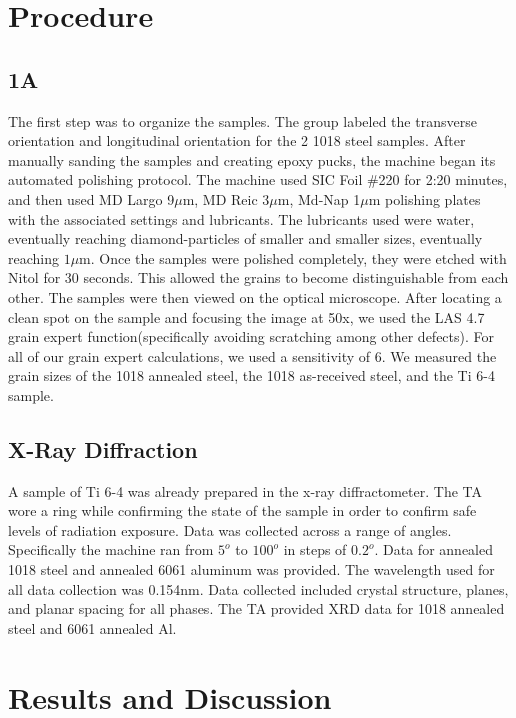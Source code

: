 \documentclass{article}
\begin{document}
\section{Procedure}

\subsection{1A}

The first step was to organize the samples. The group labeled the transverse orientation and longitudinal orientation for the 2 1018 steel samples. After manually sanding the samples and creating epoxy pucks, the machine began its automated polishing protocol. The machine used SIC Foil \#220 for 2:20 minutes, and then used MD Largo 9$\mu$m, MD Reic 3$\mu$m, Md-Nap 1$\mu$m polishing plates with the associated settings and lubricants. The lubricants used were water, eventually reaching diamond-particles of smaller and smaller sizes, eventually reaching $1\mu$m. Once the samples were polished completely, they were etched with Nitol for 30 seconds. This allowed the grains to become distinguishable from each other. The samples were then viewed on the optical microscope. After locating a clean spot on the sample and focusing the image at 50x, we used the LAS 4.7 grain expert function(specifically avoiding scratching among other defects). For all of our grain expert calculations, we used a sensitivity of 6. We measured the grain sizes of the 1018 annealed steel, the 1018 as-received steel, and the Ti 6-4 sample.

\subsection{X-Ray Diffraction}

A sample of Ti 6-4 was already prepared in the x-ray diffractometer. The TA wore a ring while confirming the state of the sample in order to confirm safe levels of radiation exposure. Data was collected across a range of angles. Specifically the machine ran from $5^o$ to $100^o$ in steps of $0.2^o$. Data for annealed 1018 steel and annealed 6061 aluminum was provided. The wavelength used for all data collection was 0.154nm. Data collected included crystal structure, planes, and planar spacing for all phases. The TA provided XRD data for 1018 annealed steel and 6061 annealed Al.

\section{Results and Discussion}
\end{document}
